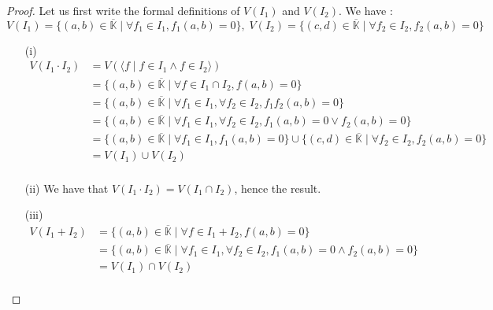 \documentclass{article}
\begin{document}
\begin{proof}
    Let us first write the formal definitions of $V(I_{1})$ and $V(I_{2})$. We have : \\
    \begin{displaymath}
        V(I_{1}) = \{ (a, b) \in \overline{\mathbb{K}} \mid \forall f_{1} \in I_{1}, f_{1}(a, b) = 0 \}, \;
        V(I_{2}) = \{ (c, d) \in \overline{\mathbb{K}} \mid \forall f_{2} \in I_{2}, f_{2}(a, b) = 0 \} 
    \end{displaymath}
    \begin{enumerate}
        \item[(i)] 
        \begin{align*}
            V(I_{1} \cdot I_{2})
            & = V( \langle f \mid f \in I_{1} \land f \in I_{2} \rangle) \\
            & = \{(a, b) \in \overline{\mathbb{K}} \mid \forall f \in I_{1} \cap I_{2}, f(a, b) = 0\} \\
            & = \{ (a, b) \in \overline{\mathbb{K}} \mid \forall f_{1} \in I_{1}, \forall f_{2} \in I_{2}, f_{1}f_{2}(a, b) = 0 \} \\ %
            & = \{ (a, b) \in \overline{\mathbb{K}} \mid \forall f_{1} \in I_{1}, \forall f_{2} \in I_{2}, f_{1}(a, b) = 0 \lor f_{2}(a, b) = 0 \} \\
            & = \{ (a, b) \in \overline{\mathbb{K}} \mid \forall f_{1} \in I_{1}, f_{1}(a, b) = 0 \} \cup 
            \{ (c, d) \in \overline{\mathbb{K}} \mid \forall f_{2} \in I_{2}, f_{2}(a, b) = 0 \} \\
            & = V(I_{1}) \cup V(I_{2}) \\
        \end{align*}
        \item[(ii)] We have that $V(I_{1} \cdot I_{2}) = V(I_{1} \cap I_{2})$, hence the result.
        \item[(iii)] 
        \begin{align*} 
            V(I_{1} + I_{2}) 
            & = \{ (a, b) \in \overline{\mathbb{K}} \mid \forall f \in I_{1} + I_{2}, f(a, b) = 0\} \\
            & = \{ (a, b) \in \overline{\mathbb{K}} \mid \forall f_{1} \in I_{1}, \forall f_{2} \in I_{2}, f_{1}(a, b) = 0 \land f_{2}(a, b) = 0 \} \\
            & = V(I_{1}) \cap V(I_{2}) \\
        \end{align*}
    \end{enumerate}
\end{proof}
\end{document}
